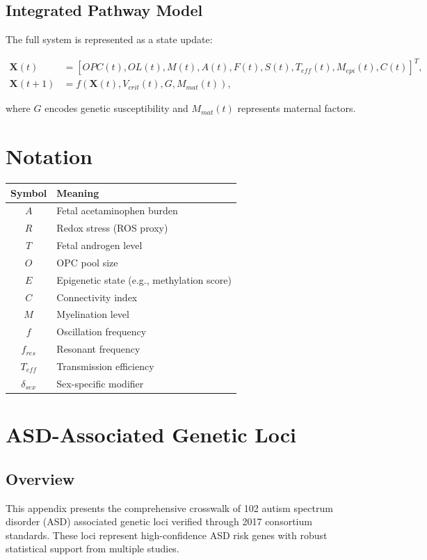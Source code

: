 \documentclass[12pt]{article}
\begin{document}
\subsection{Integrated Pathway Model}
The full system is represented as a state update:

\begin{align}
\mathbf{X}(t) &= [OPC(t), OL(t), M(t), A(t), F(t), S(t), T_{eff}(t), M_{epi}(t), C(t)]^T, \\
\mathbf{X}(t+1) &= f(\mathbf{X}(t), V_{crit}(t), G, M_{mat}(t)),
\end{align}

where $G$ encodes genetic susceptibility and $M_{mat}(t)$ represents maternal factors.

\section{Notation}

\begin{table}[h]
\centering
\begin{tabular}{cl}
\toprule
\textbf{Symbol} & \textbf{Meaning} \\
\midrule
$A$ & Fetal acetaminophen burden \\
$R$ & Redox stress (ROS proxy) \\
$T$ & Fetal androgen level \\
$O$ & OPC pool size \\
$E$ & Epigenetic state (e.g., methylation score) \\
$C$ & Connectivity index \\
$M$ & Myelination level \\
$f$ & Oscillation frequency \\
$f_{res}$ & Resonant frequency \\
$T_{eff}$ & Transmission efficiency \\
$\delta_{sex}$ & Sex-specific modifier \\
\bottomrule
\end{tabular}
\end{table}

\section{ASD-Associated Genetic Loci}

\subsection{Overview}
This appendix presents the comprehensive crosswalk of 102 autism spectrum disorder (ASD) associated genetic loci verified through 2017 consortium standards. These loci represent high-confidence ASD risk genes with robust statistical support from multiple studies.
\end{document}
